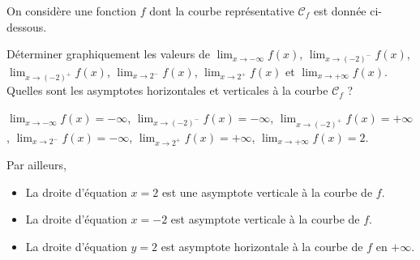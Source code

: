 \documentclass[11pt,fleqn, openany]{book} %
\begin{document}
\begin{exercise}[topic=lim21]On considère une fonction $f$ dont la courbe représentative $\mathcal{C}_f$ est donnée ci-dessous.

\begin{minipage}{0.45\linewidth}
\begin{center}
\end{center}\end{minipage} \hfill \begin{minipage}{0.49\linewidth}

Déterminer graphiquement les valeurs de  $\displaystyle \lim_{x \to -\infty} f(x)$, $\displaystyle \lim_{x \to (-2)^-} f(x)$, $\displaystyle \lim_{x \to (-2)^+} f(x)$, $\displaystyle \lim_{x \to 2^-} f(x)$, $\displaystyle \lim_{x \to 2^+} f(x)$ et $\displaystyle \lim_{x \to +\infty} f(x)$.
\vskip10pt
Quelles sont les asymptotes horizontales et verticales à la courbe $\mathcal{C}_f$ ?\end{minipage} \end{exercise}

\begin{solution}
  $\displaystyle \lim_{x \to -\infty} f(x)=-\infty$, 
 $\displaystyle \lim_{x \to (-2)^-} f(x)=-\infty$,
 $\displaystyle \lim_{x \to (-2)^+} f(x)=+\infty$,
  $\displaystyle \lim_{x \to 2^-} f(x)=-\infty$,
 $\displaystyle \lim_{x \to 2^+} f(x)=+\infty$,
 $\displaystyle \lim_{x \to +\infty} f(x)=2$.

Par ailleurs,
\begin{itemize}
\item La droite d'équation $x=2$ est une asymptote verticale à la courbe de $f$.
\item La droite d'équation $x=-2$ est asymptote verticale à la courbe de $f$.
\item La droite d'équation $y=2$ est asymptote horizontale à la courbe de $f$ en $+\infty$.
\end{itemize}\end{solution}
\end{document}
